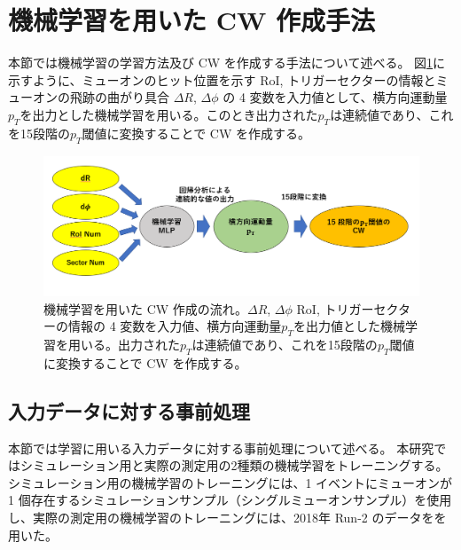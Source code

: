 \section{機械学習を用いた CW 作成手法}
本節では機械学習の学習方法及び CW を作成する手法について述べる。
図\ref{fig:MLP_over}に示すように、ミューオンのヒット位置を示す RoI, トリガーセクターの情報とミューオンの飛跡の曲がり具合 $\Delta R$, $\Delta \phi$ の 4 変数を入力値として、横方向運動量$p_T$を出力とした機械学習を用いる。このとき出力された$p_T$は連続値であり、これを15段階の$p_T$閾値に変換することで CW を作成する。

\begin{figure}[tb]
  \centering
  \includegraphics[clip, width=15cm]{fig/4/MLPoverview.png}
  \caption{機械学習を用いた CW 作成の流れ。$\Delta R$, $\Delta \phi$ RoI, トリガーセクターの情報の 4 変数を入力値、横方向運動量$p_T$を出力値とした機械学習を用いる。出力された$p_T$は連続値であり、これを15段階の$p_T$閾値に変換することで CW を作成する。}
  \label{fig:MLP_over}
\end{figure}

\subsection{入力データに対する事前処理}
本節では学習に用いる入力データに対する事前処理について述べる。
本研究ではシミュレーション用と実際の測定用の2種類の機械学習をトレーニングする。
シミュレーション用の機械学習のトレーニングには、1 イベントにミューオンが 1 個存在するシミュレーションサンプル（シングルミューオンサンプル）を使用し、実際の測定用の機械学習のトレーニングには、2018年 Run-2 のデータをを用いた。

